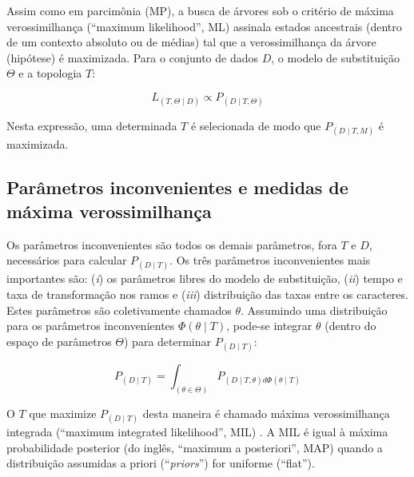 \begin{refsection}
Assim como em parcimônia (MP), a busca de árvores sob o critério de máxima verossimilhança (``maximum likelihood'', ML) assinala estados ancestrais (dentro de um contexto absoluto ou de médias) tal que a verossimilhança da árvore (hipótese) é maximizada. Para o conjunto de dados $D$, o modelo de substituição $\Theta$ e a topologia $T$:

\begin{center}
\begin{equation}
L_{(T, \Theta \mid D)} \propto P_{(D \mid T,\Theta)}
\end{equation}
\end{center}

Nesta expressão, uma determinada $T$ é selecionada de modo que $P_{(D \mid T,M )}$ é maximizada.


\subsection{Parâmetros inconvenientes e medidas de máxima verossimilhança}

Os parâmetros inconvenientes são todos os demais parâmetros, fora $T$ e $D$, necessários para calcular $P_{(D \mid T)}$. Os três parâmetros inconvenientes mais importantes são: (\textit{i}) os parâmetros libres do modelo de substituição, (\textit{ii}) tempo e taxa de transformação nos ramos e (\textit{iii}) distribuição das taxas entre os caracteres. Estes parâmetros são coletivamente chamados $\theta$. Assumindo uma distribuição para os parâmetros inconvenientes $\Phi(\theta \mid T)$, pode-se integrar $\theta$ (dentro do espaço de parâmetros $\Theta$) para determinar $P_{(D \mid T)}$:

\begin{center}
\begin{equation}
P_{(D \mid T)} = \int_{(\theta \in \Theta)} P_{(D \mid T,\theta) d\Phi(\theta \mid T)}
\end{equation}
\end{center}

O $T$ que maximize $P_{(D \mid T)}$ desta maneira é chamado máxima verossimilhança integrada (``maximum integrated likelihood'', MIL) \parencite{Steel2000}. A MIL é igual à máxima probabilidade posterior (do inglês, ``maximum a posteriori'', MAP) quando a distribuição assumidas a priori (``\textit{priors}'') for uniforme (``flat'').


\end{refsection}
